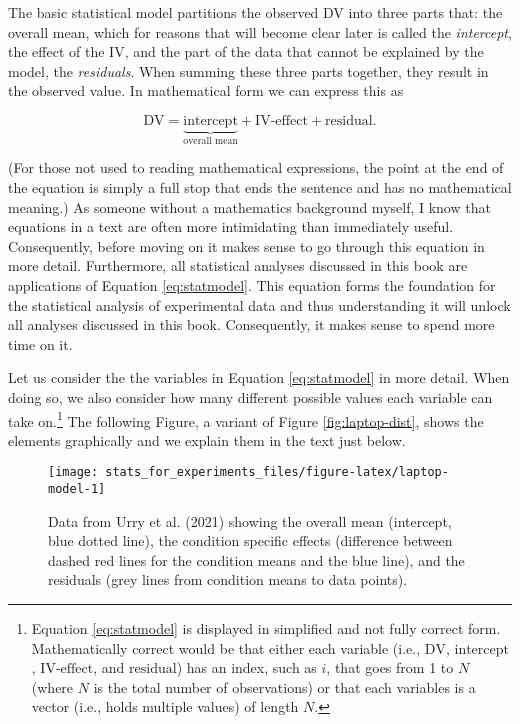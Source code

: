 \documentclass[
]{book}
\begin{document}
The basic statistical model partitions the observed DV into three parts that: the overall mean, which for reasons that will become clear later is called the \emph{intercept}, the effect of the IV, and the part of the data that cannot be explained by the model, the \emph{residuals}. When summing these three parts together, they result in the observed value. In mathematical form we can express this as

\begin{equation}
\text{DV} = \underbrace{\text{intercept}}_{\text{overall mean}} + \text{IV-effect} + \text{residual}.
\label{eq:statmodel}
\end{equation}

(For those not used to reading mathematical expressions, the point at the end of the equation is simply a full stop that ends the sentence and has no mathematical meaning.) As someone without a mathematics background myself, I know that equations in a text are often more intimidating than immediately useful. Consequently, before moving on it makes sense to go through this equation in more detail. Furthermore, all statistical analyses discussed in this book are applications of Equation \eqref{eq:statmodel}. This equation forms the foundation for the statistical analysis of experimental data and thus understanding it will unlock all analyses discussed in this book. Consequently, it makes sense to spend more time on it.

Let us consider the the variables in Equation \eqref{eq:statmodel} in more detail. When doing so, we also consider how many different possible values each variable can take on.\footnote{Equation \eqref{eq:statmodel} is displayed in simplified and not fully correct form. Mathematically correct would be that either each variable (i.e., \(\text{DV}\), \(\text{intercept}\), \(\text{IV-effect}\), and \(\text{residual}\)) has an index, such as \(i\), that goes from 1 to \(N\) (where \(N\) is the total number of observations) or that each variables is a vector (i.e., holds multiple values) of length \(N\).} The following Figure, a variant of Figure \ref{fig:laptop-dist}, shows the elements graphically and we explain them in the text just below.

\begin{figure}

{\centering \texttt{[image: stats\_for\_experiments\_files/figure-latex/laptop-model-1]} 

}

\caption{Data from Urry et al. (2021) showing the overall mean (intercept, blue dotted line), the condition specific effects (difference between dashed red lines for the condition means and the blue line), and the residuals (grey lines from condition means to data points).}\label{fig:laptop-model}
\end{figure}
\end{document}
